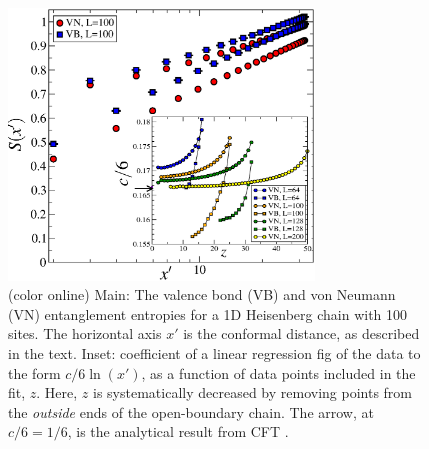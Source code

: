 \documentclass[prl,aps,twocolumn,floatfix,amsmath,amssymb,superscriptaddress,tightenlines]{revtex4}
\begin{document}
\begin{figure}
{
\includegraphics[width=3.2in]{fig1_inset.eps}
\caption{(color online) Main: The valence bond (VB) and von Neumann (VN) entanglement entropies for a 1D Heisenberg chain with 100 sites.  The horizontal axis $x'$ is the conformal distance, as described in the text.  Inset:  coefficient of a linear regression fig of the data to the form $c/6 \ln(x')$, as a function of data points included in the fit, $z$.  Here, $z$ is systematically decreased by removing points from the {\it outside} ends of the open-boundary chain.   The arrow, at $c/6=1/6$, is the analytical result from CFT \cite{Cardy}.
\label{1D}}}
\end{figure}
\end{document}
